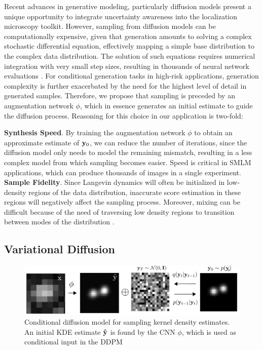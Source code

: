\documentclass{article}
\begin{document}
Recent advances in generative modeling, particularly diffusion models \citep{SohlDickstein2015,Ho2020,Song2021} present a unique opportunity to integrate uncertainty awareness into the localization microscopy toolkit. However, sampling from diffusion models can be computationally expensive, given that generation amounts to solving a complex stochastic differential equation, effectively mapping a simple base distribution to the complex data distribution. The solution of such equations requires numerical integration with very small step sizes, resulting in thousands of neural network evaluations \citep{Saharia2021,Vahdat2021}. For conditional generation tasks in high-risk applications, generation complexity is further exacerbated by the need for the highest level of detail in generated samples. Therefore, we propose that sampling is preceded by an augmentation network $\phi$, which in essence generates an initial estimate to guide the diffusion process. Reasoning for this choice in our application is two-fold:

\textbf{Synthesis Speed}. By training the augmentation network $\phi$ to obtain an approximate estimate of $\bold{y}_{0}$, we can reduce the number of iterations, since the diffusion model only needs to model the remaining mismatch, resulting in a less complex model from which sampling becomes easier. Speed is critical in SMLM applications, which can produce thousands of images in a single experiment.\\

\textbf{Sample Fidelity}. Since Langevin dynamics will often be initialized in low-density regions of the data distribution, inaccurate score estimation in these regions will negatively affect the sampling process. Moreover, mixing can be difficult because of the need of traversing low density regions to transition between modes of the distribution \citep{Song2019}.

\subsection{Variational Diffusion}

\begin{figure}
\includegraphics[scale=4.5]{media/Denoise.png}
\caption{Conditional diffusion model for sampling kernel density estimates. An initial KDE estimate $\bold{\hat{y}}$ is found by the CNN $\phi$, which is used as conditional input in the DDPM}
\end{figure}
\end{document}
